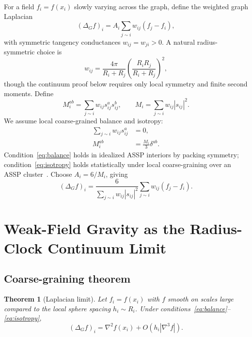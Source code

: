 \documentclass[11pt,a4paper]{article}
\newtheorem{theorem}{Theorem}
\begin{document}
For a field $f_i=f(x_i)$ slowly varying across the graph, define the weighted
graph Laplacian
\begin{equation}
  (\Delta_G f)_i=A_i\sum_{j\sim i}w_{ij}(f_j-f_i),
  \label{eq:lap_general}
\end{equation}
with symmetric tangency conductances $w_{ij}=w_{ji}>0$. A natural
radius-symmetric choice is
\begin{equation}
  w_{ij}=\frac{4\pi}{R_i+R_j}\left(\frac{R_iR_j}{R_i+R_j}\right)^2,
  \label{eq:weights}
\end{equation}
though the continuum proof below requires only local symmetry and finite
second moments. Define
\begin{equation}
  M_i^{ab}=\sum_{j\sim i}w_{ij}s_{ij}^a s_{ij}^b,\qquad
  M_i=\sum_{j\sim i}w_{ij}|s_{ij}|^2.
  \label{eq:moments}
\end{equation}
We assume local coarse-grained balance and isotropy:
\begin{align}
  \sum_{j\sim i}w_{ij}s_{ij}^a&=0,
  \label{eq:balance}\\
  M_i^{ab}&=\frac{M_i}{3}\delta^{ab}.
  \label{eq:isotropy}
\end{align}
Condition~\eqref{eq:balance} holds in idealized ASSP interiors by packing
symmetry; condition~\eqref{eq:isotropy} holds statistically under local
coarse-graining over an ASSP cluster~\cite{Mandelbrot1983,Boyd1973}. Choose
$A_i=6/M_i$, giving
\begin{equation}
  (\Delta_G f)_i
  =\frac{6}{\displaystyle\sum_{j\sim i}w_{ij}|s_{ij}|^2}
    \sum_{j\sim i}w_{ij}(f_j-f_i).
  \label{eq:normalized_lap}
\end{equation}

\section{Weak-Field Gravity as the Radius-Clock Continuum Limit}

\subsection{Coarse-graining theorem}

\begin{theorem}[Laplacian limit]
\label{thm:laplacian}
Let $f_i=f(x_i)$ with $f$ smooth on scales large compared to the local sphere
spacing $h_i\sim R_i$. Under conditions~\eqref{eq:balance}--\eqref{eq:isotropy},
\begin{equation}
  (\Delta_G f)_i=\nabla^2f(x_i)+O(h_i|\nabla^3f|).
  \label{eq:lap_limit}
\end{equation}
\end{theorem}
\end{document}
